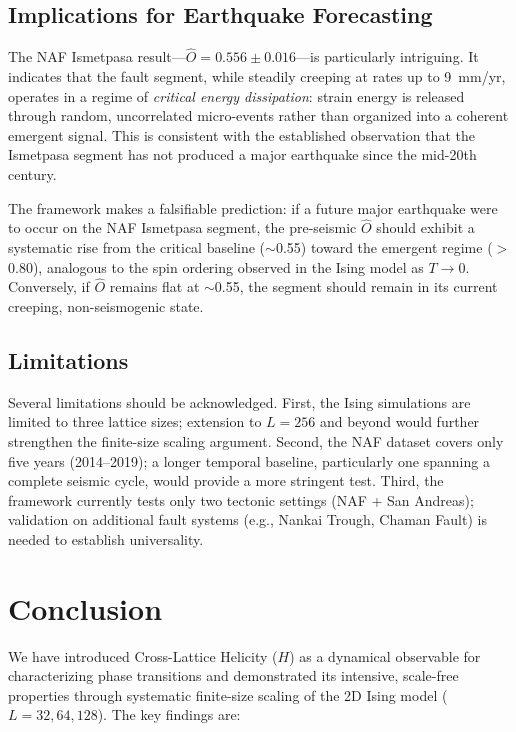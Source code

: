 \documentclass[aps,prl,twocolumn,superscriptaddress,byrevtex]{article}
\begin{document}
\subsection{Implications for Earthquake Forecasting}

The NAF Ismetpasa result---$\hat{O} = 0.556 \pm 0.016$---is particularly
intriguing. It indicates that the fault segment, while steadily creeping at
rates up to 9~mm/yr, operates in a regime of \emph{critical energy dissipation}:
strain energy is released through random, uncorrelated micro-events rather
than organized into a coherent emergent signal. This is consistent with the
established observation that the Ismetpasa segment has not produced a major
earthquake since the mid-20th century.

The framework makes a falsifiable prediction: if a future major earthquake
were to occur on the NAF Ismetpasa segment, the pre-seismic $\hat{O}$ should
exhibit a systematic rise from the critical baseline ($\sim$0.55) toward the
emergent regime ($>$0.80), analogous to the spin ordering observed in the Ising
model as $T \to 0$. Conversely, if $\hat{O}$ remains flat at $\sim$0.55, the
segment should remain in its current creeping, non-seismogenic state.

\subsection{Limitations}

Several limitations should be acknowledged. First, the Ising simulations are
limited to three lattice sizes; extension to $L = 256$ and beyond would further
strengthen the finite-size scaling argument. Second, the NAF dataset covers
only five years (2014--2019); a longer temporal baseline, particularly one
spanning a complete seismic cycle, would provide a more stringent test. Third,
the framework currently tests only two tectonic settings (NAF + San Andreas);
validation on additional fault systems (e.g., Nankai Trough, Chaman Fault) is
needed to establish universality.

\section{Conclusion}

We have introduced Cross-Lattice Helicity ($H$) as a dynamical observable for
characterizing phase transitions and demonstrated its intensive, scale-free
properties through systematic finite-size scaling of the 2D Ising model
($L = 32, 64, 128$). The key findings are:
\end{document}
